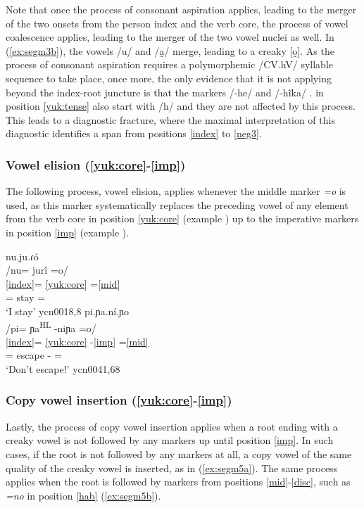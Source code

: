\documentclass[output=paper]{langscibook}
\begin{document}
Note that once the process of consonant aspiration applies, leading to the merger of the two onsets from the person index and the verb core, the process of vowel coalescence applies, leading to the merger of the two vowel nuclei as well. In (\ref{ex:segm3b}), the vowels /u/ and /a̰/ merge, leading to a creaky [o̰]. As the process of consonant aspiration requires a polymorphemic /CV.hV/ syllable sequence to take place, once more, the only evidence that it is not applying beyond the index-root juncture is that the markers /-he/ \Fut{} and /-hĩka/ \Far{}.\Hab{} in position \ref{yuk:tense} also start with /h/ and they are not affected by this process. This leads to a diagnostic fracture, where the maximal interpretation of this diagnostic identifies a span from positions \ref{index} to \ref{neg3}.

\subsubsection{Vowel elision (\ref{yuk:core}-\ref{imp})} \label{sss:eli}
The following process, vowel elision, applies whenever the middle marker \textit{=o} is used, as this marker systematically replaces the preceding vowel of any element from the verb core in position \ref{yuk:core} (example ) up to the imperative markers in position \ref{imp} (example ).

\ea \label{ex:segm4}
\ea \label{ex:segm4a}
nu.ju.ɾó  \\
\glll /nu= jurî =o/\\
     \ref{index}= \ref{yuk:core} =\ref{mid}    \\
        \Fsg{}= stay =\Mid{}\\
    \glt `I stay' \hfill ycn0018,8
\ex \label{ex:segm4b}
pi.ɲa.ní.ɲo  \\
    \glll /pi= ɲa\textsuperscript{HL} -niɲa =o/\\
          \ref{index}= \ref{yuk:core} -\ref{imp} =\ref{mid}\\
           \Ssg{}= escape -\Proh{} =\Mid{}\\
    \glt `Don't escape!' \hfill ycn0041,68
 \z
 \z

\subsubsection{Copy vowel insertion (\ref{yuk:core}-\ref{imp})}

Lastly, the process of copy vowel insertion applies when a root ending with a creaky vowel is not followed by any markers up until position \ref{imp}. In such cases, if the root is not followed by any markers at all, a copy vowel of the same quality of the creaky vowel is inserted, as in  (\ref{ex:segm5a}). The same process applies when the root is followed by markers from positions \ref{mid}-\ref{disc}, such as \textit{=no} in position \ref{hab} (\ref{ex:segm5b}). 
\end{document}
